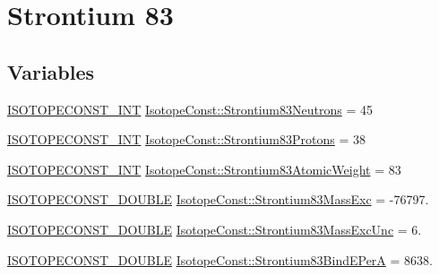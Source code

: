 \hypertarget{group___isotope_const-_strontium-_sr83}{}\section{Strontium 83}
\label{group___isotope_const-_strontium-_sr83}
\subsection*{Variables}
\begin{DoxyCompactItemize}
\item 
\mbox{\hyperlink{group___isotope_const-_macros_ga5f18360b3e99483a35c32d789e62621c}{I\+S\+O\+T\+O\+P\+E\+C\+O\+N\+S\+T\+\_\+\+I\+NT}} \mbox{\hyperlink{group___isotope_const-_strontium-_sr83_gaf5589327a61af9c3742ae369a4f401e4}{Isotope\+Const\+::\+Strontium83\+Neutrons}} = 45
\item 
\mbox{\hyperlink{group___isotope_const-_macros_ga5f18360b3e99483a35c32d789e62621c}{I\+S\+O\+T\+O\+P\+E\+C\+O\+N\+S\+T\+\_\+\+I\+NT}} \mbox{\hyperlink{group___isotope_const-_strontium-_sr83_gad5c648c2b3d2daf9cfaa3e3760e8498b}{Isotope\+Const\+::\+Strontium83\+Protons}} = 38
\item 
\mbox{\hyperlink{group___isotope_const-_macros_ga5f18360b3e99483a35c32d789e62621c}{I\+S\+O\+T\+O\+P\+E\+C\+O\+N\+S\+T\+\_\+\+I\+NT}} \mbox{\hyperlink{group___isotope_const-_strontium-_sr83_gaa8d11ea369b1c93e254ab6cccb2607a0}{Isotope\+Const\+::\+Strontium83\+Atomic\+Weight}} = 83
\item 
\mbox{\hyperlink{group___isotope_const-_macros_ga8f45a7272ce02c0b4c65c44636ed719a}{I\+S\+O\+T\+O\+P\+E\+C\+O\+N\+S\+T\+\_\+\+D\+O\+U\+B\+LE}} \mbox{\hyperlink{group___isotope_const-_strontium-_sr83_gabb18fc93fcec2e3f7b40bd7cbf25b837}{Isotope\+Const\+::\+Strontium83\+Mass\+Exc}} = -\/76797.
\item 
\mbox{\hyperlink{group___isotope_const-_macros_ga8f45a7272ce02c0b4c65c44636ed719a}{I\+S\+O\+T\+O\+P\+E\+C\+O\+N\+S\+T\+\_\+\+D\+O\+U\+B\+LE}} \mbox{\hyperlink{group___isotope_const-_strontium-_sr83_ga8ad74621b6aee60101d8063dd97f5de3}{Isotope\+Const\+::\+Strontium83\+Mass\+Exc\+Unc}} = 6.
\item 
\mbox{\hyperlink{group___isotope_const-_macros_ga8f45a7272ce02c0b4c65c44636ed719a}{I\+S\+O\+T\+O\+P\+E\+C\+O\+N\+S\+T\+\_\+\+D\+O\+U\+B\+LE}} \mbox{\hyperlink{group___isotope_const-_strontium-_sr83_gab6e516c808dabde5b5161fc5f04bdfa9}{Isotope\+Const\+::\+Strontium83\+Bind\+E\+PerA}} = 8638.
\item 

\end{DoxyCompactItemize}
